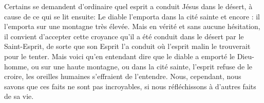 Certains se demandent d’ordinaire quel esprit a conduit Jésus dans le désert,
	à cause de ce qui se lit ensuite:
		Le diable l’emporta dans la cité sainte
	et encore :
		il l’emporta sur une montagne très élevée.
Mais en vérité et sans aucune hésitation, il convient d’accepter cette croyance
	qu’il a été conduit dans le désert par le Saint-Esprit,
	de sorte que son Esprit l’a conduit
		où l’esprit malin le trouverait pour le tenter.
Mais voici qu’en entendant dire que le diable a emporté le Dieu-homme,
	ou sur une haute montagne, ou dans la cité sainte,
	l’esprit refuse de le croire,
	les oreilles humaines s’effraient de l’entendre.
Nous, cependant, nous savons que ces faits ne sont pas incroyables,
	si nous réfléchissons à d’autres faits de sa vie.
